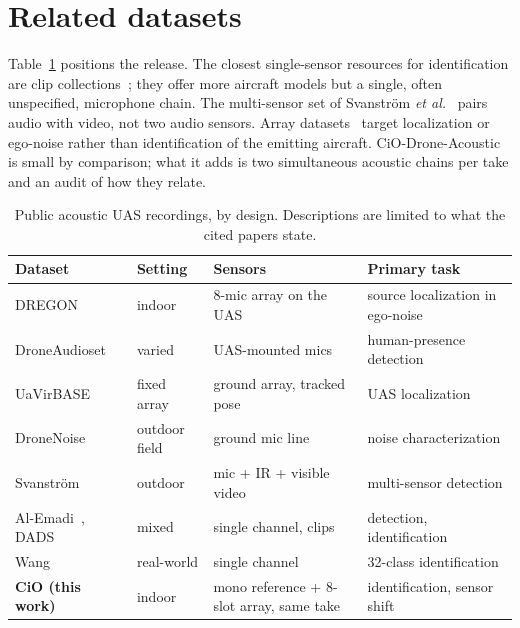 \documentclass[journal]{IEEEtran}
\begin{document}
\section{Related datasets}\label{sec:related}
Table~\ref{tab:related} positions the release.
The closest single-sensor resources for identification are clip collections~\cite{alemadi2019audio,dads,wang2025multiclass}; they offer more aircraft models but a single, often unspecified, microphone chain.
The multi-sensor set of Svanstr\"om \emph{et al.}~\cite{svanstrom2021dataset} pairs audio with video, not two audio sensors.
Array datasets~\cite{strauss2018dregon,jekaterynczuk2025uavirbase,gupta2025droneaudioset} target localization or ego-noise rather than identification of the emitting aircraft.
CiO-Drone-Acoustic is small by comparison; what it adds is two simultaneous acoustic chains per take and an audit of how they relate.

\begin{table}[t]
\caption{Public acoustic UAS recordings, by design. Descriptions are limited to what the cited papers state.}
\label{tab:related}
\centering\scriptsize
\setlength{\tabcolsep}{2.5pt}
\begin{tabular}{@{}p{2.15cm}p{1.35cm}p{2.2cm}p{2.1cm}@{}}
\toprule
Dataset & Setting & Sensors & Primary task \\
\midrule
DREGON~\cite{strauss2018dregon} & indoor & 8-mic array on the UAS & source localization in ego-noise \\
DroneAudioset~\cite{gupta2025droneaudioset} & varied & UAS-mounted mics & human-presence detection \\
UaVirBASE~\cite{jekaterynczuk2025uavirbase} & fixed array & ground array, tracked pose & UAS localization \\
DroneNoise~\cite{ramosromero2023dronenoise} & outdoor field & ground mic line & noise characterization \\
Svanstr\"om~\cite{svanstrom2021dataset} & outdoor & mic + IR + visible video & multi-sensor detection \\
Al-Emadi~\cite{alemadi2019audio}, DADS~\cite{dads} & mixed & single channel, clips & detection, identification \\
Wang~\cite{wang2025multiclass} & real-world & single channel & 32-class identification \\
\textbf{CiO (this work)} & indoor & mono reference + 8-slot array, same take & identification, sensor shift \\
\bottomrule
\end{tabular}
\end{table}
\end{document}
